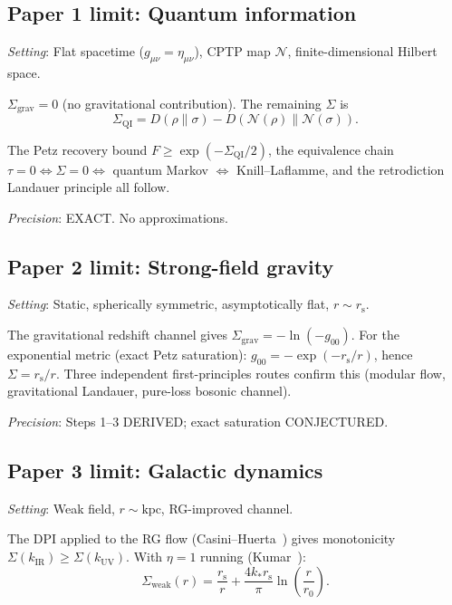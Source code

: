\documentclass[aps,prd,preprint,superscriptaddress,longbibliography]{revtex4-2}
\newcommand{\chan}{\mathcal{N}}
\newcommand{\KL}{D}
\newcommand{\tauasym}{\tau}
\newcommand{\rs}{r_{\mathrm{s}}}
\begin{document}
\subsection{Paper 1 limit: Quantum information}

\emph{Setting}: Flat spacetime ($g_{\mu\nu} = \eta_{\mu\nu}$), CPTP
map $\chan$, finite-dimensional Hilbert space.

$\Sigma_{\mathrm{grav}} = 0$ (no gravitational contribution).
The remaining $\Sigma$ is
\begin{equation}
\Sigma_{\mathrm{QI}} = \KL(\rho\|\sigma) - \KL(\chan(\rho)\|\chan(\sigma)).
\label{eq:limit1}
\end{equation}

The Petz recovery bound $F\ge\exp(-\Sigma_{\mathrm{QI}}/2)$, the
equivalence chain $\tauasym=0\Leftrightarrow\Sigma=0
\Leftrightarrow$ quantum Markov $\Leftrightarrow$ Knill--Laflamme,
and the retrodiction Landauer principle all follow.

\emph{Precision}: EXACT.  No approximations.

\subsection{Paper 2 limit: Strong-field gravity}

\emph{Setting}: Static, spherically symmetric, asymptotically flat,
$r\sim\rs$.

The gravitational redshift channel gives
$\Sigma_{\mathrm{grav}} = -\ln(-g_{00})$.  For the exponential metric
(exact Petz saturation):
$g_{00} = -\exp(-\rs/r)$, hence $\Sigma = \rs/r$.  Three
independent first-principles routes confirm this
(modular flow, gravitational Landauer, pure-loss bosonic channel).

\emph{Precision}: Steps 1--3 DERIVED; exact saturation CONJECTURED.

\subsection{Paper 3 limit: Galactic dynamics}

\emph{Setting}: Weak field, $r\sim\mathrm{kpc}$, RG-improved channel.

The DPI applied to the RG flow (Casini--Huerta~\cite{CasiniTeste2017})
gives monotonicity $\Sigma(k_{\mathrm{IR}})\ge\Sigma(k_{\mathrm{UV}})$.
With $\eta=1$ running (Kumar~\cite{Kumar2025}):
\begin{equation}
\Sigma_{\mathrm{weak}}(r) = \frac{\rs}{r}
+ \frac{4k_*\rs}{\pi}\ln\!\left(\frac{r}{r_0}\right).
\label{eq:limit3}
\end{equation}
\end{document}
